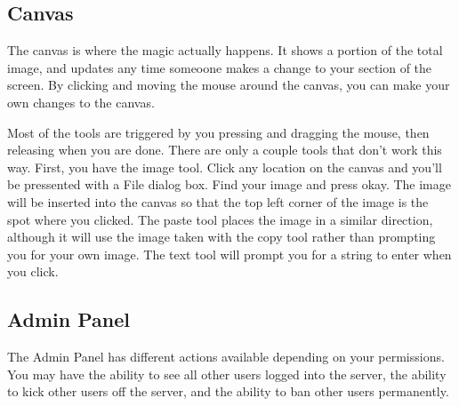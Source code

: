 \documentclass[11pt,oneside,a4paper]{article}
\begin{document}
\subsection{Canvas}
The canvas is where the magic actually happens. It shows a portion of the total
image, and updates any time someoone makes a change to your section of the
screen. By clicking and moving the mouse around the canvas, you can make your
own changes to the canvas.

Most of the tools are triggered by you pressing and dragging the mouse, then
releasing when you are done. There are only a couple tools that don't work this
way. First, you have the image tool. Click any location on the canvas and
you'll be pressented with a File dialog box. Find your image and press okay.
The image will be inserted into the canvas so that the top left corner of the
image is the spot where you clicked. The paste tool places the image in a
similar direction, although it will use the image taken with the copy tool
rather than prompting you for your own image. The text tool will prompt you for
a string to enter when you click.
\subsection{Admin Panel}
The Admin Panel has different actions available depending on your permissions.
You may have the ability to see all other users logged into the server, the
ability to kick other users off the server, and the ability to ban other users
permanently.
\end{document}
